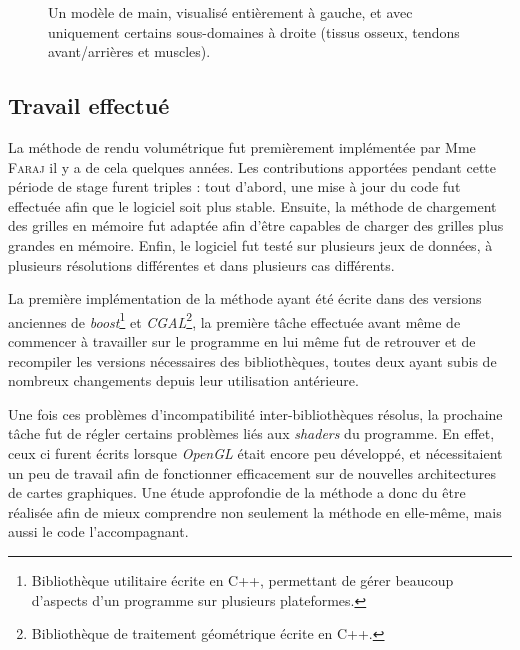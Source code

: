 {{{\begin{figure}[!h]
\begin{subfigure}{.49\linewidth}
    			    \label{img:hand_less}
			    \end{subfigure}
			    \caption{Un modèle de main, visualisé entièrement à gauche, et avec uniquement certains sous-domaines à droite (tissus osseux, tendons avant/arrières et muscles).}
			    \label{img:hands}
			\end{figure}
		}

		\subsection{Travail effectué}
		{
			La méthode de rendu volumétrique fut premièrement implémentée par Mme \textsc{Faraj} il y a de cela quelques années. Les contributions apportées pendant cette période de stage furent triples : tout d'abord, une mise à jour du code fut effectuée afin que le logiciel soit plus stable. Ensuite, la méthode de chargement des grilles en mémoire fut adaptée afin d'être capables de charger des grilles plus grandes en mémoire. Enfin, le logiciel fut testé sur plusieurs jeux de données, à plusieurs résolutions différentes et dans plusieurs cas différents.

			La première implémentation de la méthode ayant été écrite dans des versions anciennes de \textit{boost}\footnote{Bibliothèque utilitaire écrite en C++, permettant de gérer beaucoup d'aspects d'un programme sur plusieurs plateformes.} et \textit{CGAL}\footnote{Bibliothèque de traitement géométrique écrite en C++.}, la première tâche effectuée avant même de commencer à travailler sur le programme en lui même fut de retrouver et de recompiler les versions nécessaires des bibliothèques, toutes deux ayant subis de nombreux changements depuis leur utilisation antérieure.

			Une fois ces problèmes d'incompatibilité inter-bibliothèques résolus, la prochaine tâche fut de régler certains problèmes liés aux \textit{shaders} du programme. En effet, ceux ci furent écrits lorsque \textit{OpenGL} était encore peu développé, et nécessitaient un peu de travail afin de fonctionner efficacement sur de nouvelles architectures de cartes graphiques. Une étude approfondie de la méthode a donc du être réalisée afin de mieux comprendre non seulement la méthode en elle-même, mais aussi le code l'accompagnant.

}}}
